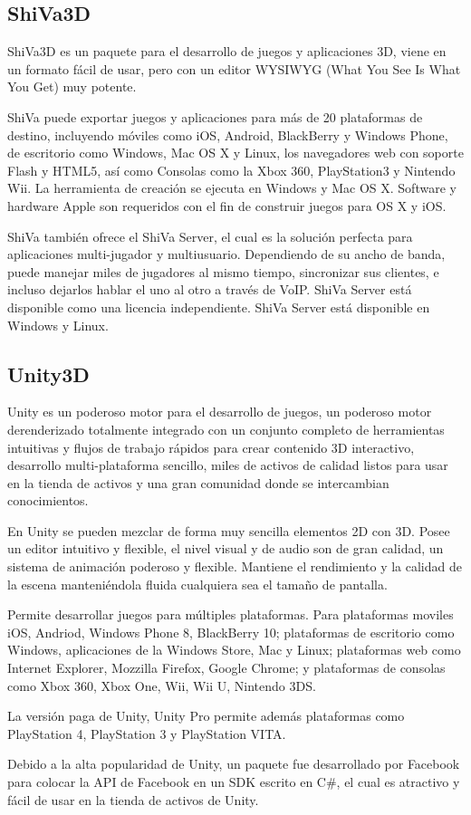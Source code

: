 \subsection{ShiVa3D}

ShiVa3D\cite{shiva} es un paquete para el desarrollo de juegos y aplicaciones 3D, viene en un formato fácil de usar, pero con un editor WYSIWYG (What You See Is What You Get) muy potente.

ShiVa puede exportar juegos y aplicaciones para más de 20 plataformas de destino, incluyendo móviles como iOS, Android, BlackBerry y Windows Phone, de escritorio como Windows, Mac OS X y Linux, los navegadores web con soporte Flash y HTML5, así como Consolas como la Xbox 360, PlayStation3 y Nintendo Wii. La herramienta de creación se ejecuta en Windows y Mac OS X. Software y hardware Apple son requeridos con el fin de construir juegos para OS X y iOS.

ShiVa también ofrece el ShiVa Server, el cual es la solución perfecta para aplicaciones multi-jugador y multiusuario. Dependiendo de su ancho de banda, puede manejar miles de jugadores al mismo tiempo, sincronizar sus clientes, e incluso dejarlos hablar el uno al otro a través de VoIP. ShiVa Server está disponible como una licencia independiente. ShiVa Server está disponible en Windows y Linux.


\subsection{Unity3D}

Unity\cite{unity3d} es un poderoso motor para el desarrollo de juegos, un poderoso motor derenderizado totalmente integrado con un conjunto completo de herramientas intuitivas y flujos de trabajo rápidos para crear contenido 3D interactivo, desarrollo multi-plataforma sencillo, miles de activos de calidad listos para usar en la tienda
de activos y una gran comunidad donde se intercambian conocimientos.

En Unity se pueden mezclar de forma muy sencilla elementos 2D con 3D. Posee un editor intuitivo y flexible, 
el nivel visual y de audio son de gran calidad, un sistema de animación poderoso y flexible. Mantiene el 
rendimiento y la calidad de la escena manteniéndola fluida cualquiera sea el tamaño de pantalla. 

Permite desarrollar juegos para múltiples plataformas. Para plataformas moviles iOS, Andriod, Windows Phone 8, BlackBerry 10; plataformas de escritorio como Windows, aplicaciones de la Windows Store, Mac y Linux; plataformas web como Internet Explorer, Mozzilla Firefox, Google Chrome; y plataformas de consolas como Xbox 360, Xbox One, Wii, Wii U, Nintendo 3DS.

La versión paga de Unity, Unity Pro permite además plataformas como PlayStation 4, PlayStation 3 y PlayStation VITA.

Debido a la alta popularidad de Unity, un paquete fue desarrollado por Facebook para colocar la API de
Facebook en un SDK escrito en C\#, el cual es atractivo y fácil de usar en la tienda de activos de Unity.
